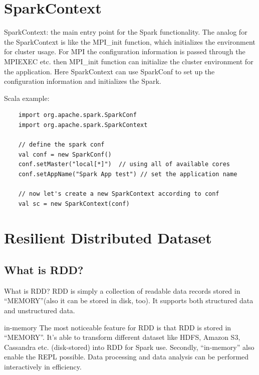 \documentclass[notheorems, aspectratio=54]{beamer}
\begin{document}
\section{SparkContext}
\begin{frame}[fragile]
  

   \begin{block}{SparkContext: the main entry point for the Spark functionality.}
   The analog for the SparkContext  is like the MPI\_init function, which initializes the environment for cluster usage. 
   For MPI the configuration information is passed through the MPIEXEC etc. then 
   MPI\_init function can initialize the cluster environment for the application.
   Here SparkContext can use SparkConf
   to set up the configuration information and initializes the Spark.
   \end{block}
   
   Scala example:
   \begin{verbatim}
    import org.apache.spark.SparkConf
    import org.apache.spark.SparkContext

    // define the spark conf
    val conf = new SparkConf()
    conf.setMaster("local[*]")  // using all of available cores 
    conf.setAppName("Spark App test") // set the application name

    // now let's create a new SparkContext according to conf
    val sc = new SparkContext(conf)
   \end{verbatim}     
  
\end{frame}


\section{Resilient Distributed Dataset}
\subsection{What is RDD?}
\begin{frame}

 \begin{block}{What is RDD?}
  RDD is simply a collection of readable data records stored in ``MEMORY''(also it can be stored in disk, too). It supports both structured data and unstructured data. 
 \end{block}
 
 \begin{block}{in-memory}
   The most noticeable feature for RDD is that RDD is stored in ``MEMORY''. 
 It's able to transform different dataset like HDFS, Amazon S3, Cassandra etc. 
 (disk-stored) into RDD for Spark use. Secondly, ``in-memory'' also enable the 
 REPL possible. Data processing and data analysis can be performed interactively
 in efficiency. 
 \end{block}

\end{frame}
\end{document}
